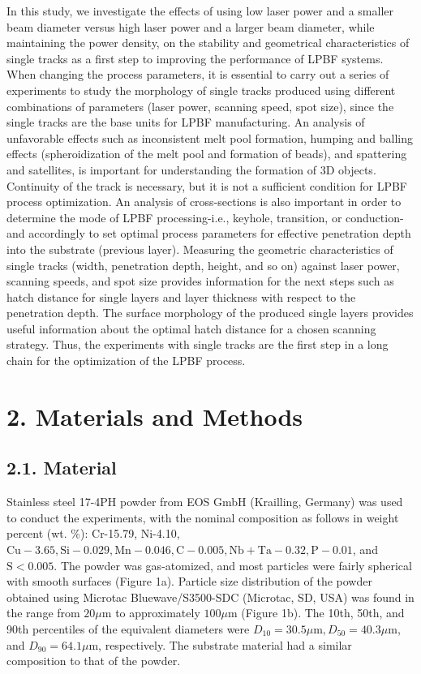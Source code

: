 \documentclass[10pt]{article}
\begin{document}
In this study, we investigate the effects of using low laser power and a smaller beam diameter versus high laser power and a larger beam diameter, while maintaining the power density, on the stability and geometrical characteristics of single tracks as a first step to improving the performance of LPBF systems. When changing the process parameters, it is essential to carry out a series of experiments to study the morphology of single tracks produced using different combinations of parameters (laser power, scanning speed, spot size), since the single tracks are the base units for LPBF manufacturing. An analysis of unfavorable effects such as inconsistent melt pool formation, humping and balling effects (spheroidization of the melt pool and formation of beads), and spattering and satellites, is important for understanding the formation of 3D objects. Continuity of the track is necessary, but it is not a sufficient condition for LPBF process optimization. An analysis of cross-sections is also important in order to determine the mode of LPBF processing-i.e., keyhole, transition, or conduction-and accordingly to set optimal process parameters for effective penetration depth into the substrate (previous layer). Measuring the geometric characteristics of single tracks (width, penetration depth, height, and so on) against laser power, scanning speeds, and spot size provides information for the next steps such as hatch distance for single layers and layer thickness with respect to the penetration depth. The surface morphology of the produced single layers provides useful information about the optimal hatch distance for a chosen scanning strategy. Thus, the experiments with single tracks are the first step in a long chain for the optimization of the LPBF process.

\section*{2. Materials and Methods}
\subsection*{2.1. Material}
Stainless steel 17-4PH powder from EOS GmbH (Krailling, Germany) was used to conduct the experiments, with the nominal composition as follows in weight percent (wt. \%): Cr-15.79, Ni-4.10, $\mathrm{Cu}-3.65, \mathrm{Si}-0.029, \mathrm{Mn}-0.046, \mathrm{C}-0.005, \mathrm{Nb}+\mathrm{Ta}-0.32, \mathrm{P}-0.01$, and $\mathrm{S}<0.005$. The powder was gas-atomized, and most particles were fairly spherical with smooth surfaces (Figure 1a). Particle size distribution of the powder obtained using Microtac Bluewave/S3500-SDC (Microtac, SD, USA) was found in the range from $20 \mu \mathrm{m}$ to approximately $100 \mu \mathrm{m}$ (Figure 1b). The 10th, 50th, and 90th percentiles of the equivalent diameters were $D_{10}=30.5 \mu \mathrm{m}, D_{50}=40.3 \mu \mathrm{m}$, and $D_{90}=64.1 \mu \mathrm{m}$, respectively. The substrate material had a similar composition to that of the powder.
\end{document}
